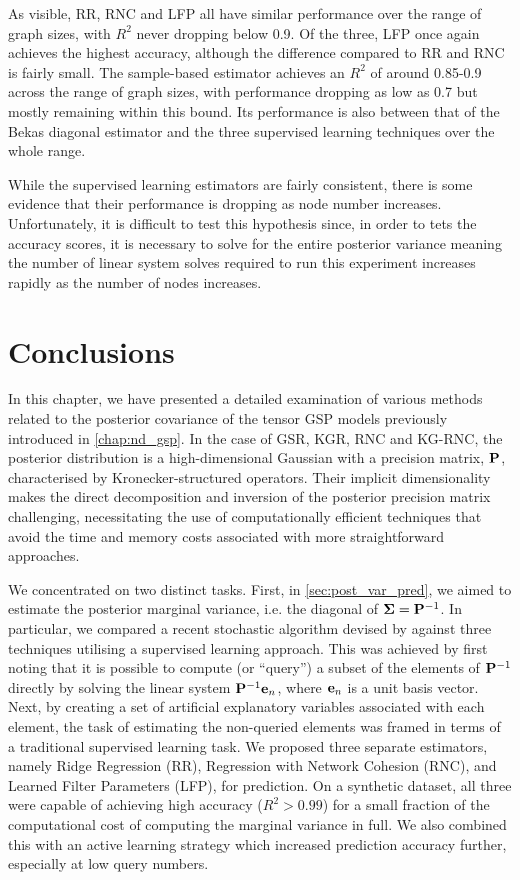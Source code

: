 As visible, RR, RNC and LFP all have similar performance over the range of graph sizes, with $R^2$ never dropping below 0.9. Of the three, LFP once again achieves the highest accuracy, although the difference compared to RR and RNC is fairly small. The sample-based estimator achieves an $R^2$ of around 0.85-0.9 across the range of graph sizes, with performance dropping as low as 0.7 but mostly remaining within this bound. Its performance is also between that of the Bekas diagonal estimator and the three supervised learning techniques over the whole range. 

While the supervised learning estimators are fairly consistent, there is some evidence that their performance is dropping as node number increases. Unfortunately, it is difficult to test this hypothesis since, in order to tets the accuracy scores, it is necessary to solve for the entire posterior variance meaning the number of linear system solves required to run this experiment increases rapidly as the number of nodes increases. 

\section{Conclusions}

In this chapter, we have presented a detailed examination of various methods related to the posterior covariance of the tensor GSP models previously introduced in \cref{chap:nd_gsp}. In the case of GSR, KGR, RNC and KG-RNC, the posterior distribution is a high-dimensional Gaussian with a precision matrix, $\mathbf{P}$, characterised by Kronecker-structured operators. Their implicit dimensionality makes the direct decomposition and inversion of the posterior precision matrix challenging, necessitating the use of computationally efficient techniques that avoid the time and memory costs associated with more straightforward approaches.

We concentrated on two distinct tasks. First, in \cref{sec:post_var_pred}, we aimed to estimate the posterior marginal variance, i.e. the diagonal of $\mathbf{\Sigma} = \mathbf{P}^{-1}$. In particular, we compared a recent stochastic algorithm devised by \cite{Bekas2007} against three techniques utilising a supervised learning approach. This was achieved by first noting that it is possible to compute (or ``query'') a subset of the elements of $\mathbf{P}^{-1}$ directly by solving the linear system $\mathbf{P}^{-1} \mathbf{e}_n$, where $\mathbf{e}_n$ is a unit basis vector. Next, by creating a set of artificial explanatory variables associated with each element, the task of estimating the non-queried elements was framed in terms of a traditional supervised learning task. We proposed three separate estimators, namely Ridge Regression (RR), Regression with Network Cohesion (RNC), and Learned Filter Parameters (LFP), for prediction. On a synthetic dataset, all three were capable of achieving high accuracy ($R^2 > 0.99$) for a small fraction of the computational cost of computing the marginal variance in full. We also combined this with an active learning strategy which increased prediction accuracy further, especially at low query numbers.  

